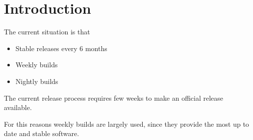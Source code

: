 \section{Introduction} \label{sec:intro}

The current situation is  that
\begin{itemize}
\item Stable releases every 6 months
\item Weekly builds
\item Nightly builds
\end{itemize}

The current release process requires few weeks to make an official release available.

For this reasons weekly builds are largely used, since they provide the most up to date and stable software.


